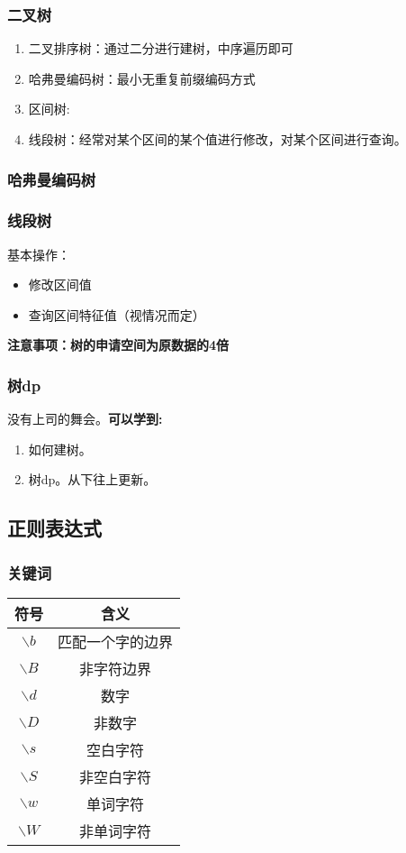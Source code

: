 \documentclass[a4paper]{article}
\begin{document}
	\subsubsection{二叉树}
	\begin{enumerate}
		\item 二叉排序树：通过二分进行建树，中序遍历即可
		\item 哈弗曼编码树：最小无重复前缀编码方式
		\item 区间树:
		\item 线段树：经常对某个区间的某个值进行修改，对某个区间进行查询。
	\end{enumerate}
	\subsubsection{哈弗曼编码树}
	
	\subsubsection{线段树}
	基本操作：\begin{itemize}
		\item 修改区间值
		\item 查询区间特征值（视情况而定） 
	\end{itemize}
	\textbf{注意事项：树的申请空间为原数据的4倍}
	
	\subsubsection{树dp}
	没有上司的舞会。\textbf{可以学到:}
	\begin{enumerate}
		\item 如何建树。
		\item 树dp。从下往上更新。
	\end{enumerate}
	
	\subsection{正则表达式}
	\subsubsection{关键词}
	\begin{table}[H]
		\begin{tabular}{c|c}
			\hline
			符号	&	含义	\\
			\hline
			$\backslash b$ &	匹配一个字的边界  \\
			$\backslash B$ &	非字符边界	\\
			$\backslash d$ &	数字	\\
			$\backslash D$ &	非数字	\\
			$\backslash s$ &	空白字符\\
			$\backslash S$ &	非空白字符\\
			$\backslash w$ &	单词字符\\
			$\backslash W$ &	非单词字符\\
			\hline
		\end{tabular}
	\end{table}
\end{document}

